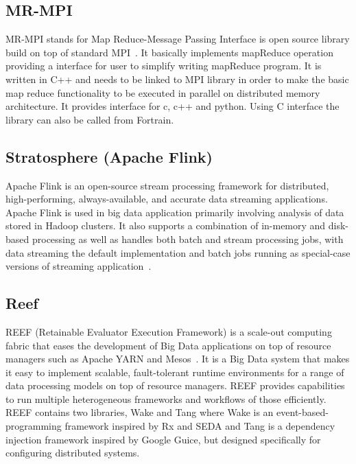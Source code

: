      \pv

\subsection{MR-MPI}

MR-MPI stands for Map Reduce-Message Passing Interface is open source
library build on top of standard MPI~\cite{www-mapreducempi}. It
basically implements mapReduce operation providing a interface for
user to simplify writing mapReduce program.  It is written in C++ and
needs to be linked to MPI library in order to make the basic map
reduce functionality to be executed in parallel on distributed memory
architecture.  It provides interface for c, c++ and python. Using C
interface the library can also be called from Fortrain.

     \pv

\subsection{Stratosphere (Apache Flink)}
     
Apache Flink is an open-source stream processing framework for
distributed, high-performing, always-available, and accurate data
streaming applications. Apache Flink is used in big data application
primarily involving analysis of data stored in Hadoop clusters.  It
also supports a combination of in-memory and disk-based processing as
well as handles both batch and stream processing jobs, with data
streaming the default implementation and batch jobs running as
special-case versions of streaming application~\cite{www-flink}.


\subsection{Reef}

REEF (Retainable Evaluator Execution Framework) is a scale-out
computing fabric that eases the development of Big Data applications
on top of resource managers such as Apache YARN and
Mesos~\cite{www-reef}. It is a Big Data system that makes it easy to
implement scalable, fault-tolerant runtime environments for a range of
data processing models on top of resource managers. REEF provides
capabilities to run multiple heterogeneous frameworks and workflows of
those efficiently. REEF contains two libraries, Wake and Tang where
Wake is an event-based-programming framework inspired by Rx and SEDA
and Tang is a dependency injection framework inspired by Google Guice,
but designed specifically for configuring distributed systems.

